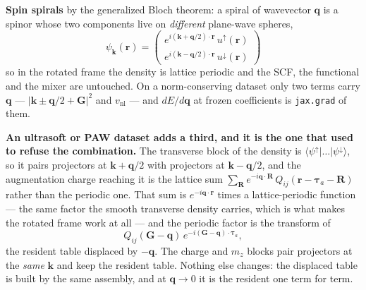 \documentclass[11pt,a4paper]{article}
\newcommand{\code}[1]{\texttt{\small #1}}
\begin{document}
\textbf{Spin spirals} by the generalized Bloch theorem: a spiral of wavevector
$\mathbf q$ is a spinor whose two components live on \emph{different} plane-wave
spheres,
\begin{equation*}
\psi_{\mathbf k}(\mathbf r) = \begin{pmatrix}
  e^{i(\mathbf k + \mathbf q/2)\cdot\mathbf r}\,u^{\uparrow}(\mathbf r) \\[3pt]
  e^{i(\mathbf k - \mathbf q/2)\cdot\mathbf r}\,u^{\downarrow}(\mathbf r)
\end{pmatrix}
\end{equation*}
so in the rotated frame the density is lattice periodic and the SCF, the
functional and the mixer are untouched. On a norm-conserving dataset only two
terms carry $\mathbf q$ --- $|\mathbf k \pm \mathbf q/2 + \mathbf G|^2$ and
$v_{\mathrm{nl}}$ --- and $dE/d\mathbf q$ at frozen coefficients is
\code{jax.grad} of them.

\textbf{An ultrasoft or PAW dataset adds a third, and it is the one that used to
refuse the combination.} The transverse block of the density is
$\langle\psi^{\uparrow}|\ldots|\psi^{\downarrow}\rangle$, so it pairs projectors
at $\mathbf k + \mathbf q/2$ with projectors at $\mathbf k - \mathbf q/2$, and
the augmentation charge reaching it is the lattice sum
$\sum_{\mathbf R} e^{-i\mathbf q\cdot\mathbf R}\,
Q_{ij}(\mathbf r - \boldsymbol\tau_a - \mathbf R)$
rather than the periodic one. That sum is $e^{-i\mathbf q\cdot\mathbf r}$ times
a lattice-periodic function --- the same factor the smooth transverse density
carries, which is what makes the rotated frame work at all --- and the periodic
factor is the transform of
\begin{equation*}
Q_{ij}(\mathbf G - \mathbf q)\, e^{-i(\mathbf G - \mathbf q)\cdot\boldsymbol\tau_a},
\end{equation*}
the resident table displaced by $-\mathbf q$. The charge and $m_z$ blocks pair
projectors at the \emph{same} $\mathbf k$ and keep the resident table. Nothing
else changes: the displaced table is built by the same assembly, and at
$\mathbf q \to 0$ it is the resident one term for term.
\end{document}
